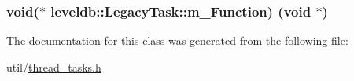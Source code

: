 \subsubsection[{m\+\_\+\+Function}]{\setlength{\rightskip}{0pt plus 5cm}void($\ast$ leveldb\+::\+Legacy\+Task\+::m\+\_\+\+Function) (void $\ast$)\hspace{0.3cm}{\ttfamily [protected]}}\label{classleveldb_1_1_legacy_task_a49048d932619d81574332558fc1bea8b}


The documentation for this class was generated from the following file\+:\begin{DoxyCompactItemize}
\item 
util/\hyperlink{thread__tasks_8h}{thread\+\_\+tasks.\+h}\end{DoxyCompactItemize}

